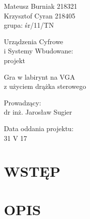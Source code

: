 \documentclass[11pt]{article}
\begin{document}
\thispagestyle{empty}

\noindent
Mateusz Burniak 218321 \\
Krzysztof Cyran 218405 \\
grupa: śr/11/TN

\vfill

\begin{center}
  \begin{Huge}
    Urządzenia Cyfrowe \\
    i Systemy Wbudowane: \\
    \vspace{.5cm}
    projekt
  \end{Huge}
  
  \vspace{3cm}
  
  \begin{Large}
    Gra w labirynt na VGA \\
    z użyciem drążka sterowego
  \end{Large}
  
  \vspace{3cm}
  
  \begin{Large}
    Prowadzący: \\
    dr inż. Jarosław Sugier
  \end{Large}
  
  \vspace{3cm}
  
  Data oddania projektu: \\
  31 V 17
  
\end{center}

\vfill

\newpage

\section{WSTĘP}

\section{OPIS}
\end{document}
